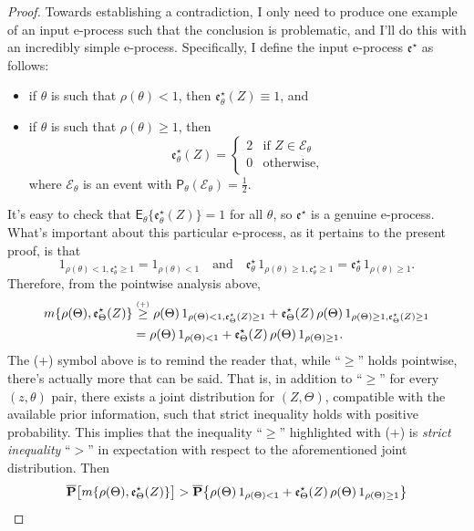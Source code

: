\documentclass[a4paper, 12pt]{article}
\theoremstyle{plain}
\theoremstyle{definition}
\theoremstyle{remark}
\newcommand{\prob}{\mathsf{P}}
\newcommand{\E}{\mathsf{E}}
\newcommand{\uuprob}{\mathbf{\overline{P}}}
\newcommand{\eval}{\mathfrak{e}}
\begin{document}
\begin{proof}
Towards establishing a contradiction, I only need to produce one example of an input e-process such that the conclusion is problematic, and I'll do this with an incredibly simple e-process.  Specifically, I define the input e-process $\eval^\star$ as follows:
\begin{itemize}
\item if $\theta$ is such that $\rho(\theta) < 1$, then $\eval_\theta^\star(Z) \equiv 1$, and 
\vspace{-2mm}
\item if $\theta$ is such that $\rho(\theta) \geq 1$, then  
\[ \eval_\theta^\star(Z) = \begin{cases} 2 & \text{if $Z \in \mathcal{E}_\theta$} \\ 0 & \text{otherwise}, \end{cases} \]
where $\mathcal{E}_\theta$ is an event with $\prob_\theta(\mathcal{E}_\theta) = \frac12$.
\end{itemize} 
It's easy to check that $\E_\theta\{ \eval_\theta^\star(Z) \} = 1$ for all $\theta$, so $\eval^\star$ is a genuine e-process.  What's important about this particular e-process, as it pertains to the present proof, is that 
\[ 1_{\rho(\theta) < 1, \eval_\theta^\star \geq 1} = 1_{\rho(\theta) < 1} \quad \text{and} \quad \eval_\theta^\star \, 1_{\rho(\theta) \geq 1, \eval_\theta^\star \geq 1} = \eval_\theta^\star \, 1_{\rho(\theta) \geq 1}. \]
Therefore, from the pointwise analysis above, 
\begin{align*}
m\{ \rho(\Theta), \eval_\Theta^\star(Z) \} & \overset{\text{\tiny (+)}}{\geq} \rho(\Theta) \, 1_{\rho(\Theta) < 1, \eval_\Theta^\star(Z) \geq 1} + \eval_\Theta^\star(Z) \, \rho(\Theta) \, 1_{\rho(\Theta) \geq 1, \eval_\Theta^\star(Z) \geq 1} \\
& = \rho(\Theta) \, 1_{\rho(\Theta) < 1} + \eval_\Theta^\star(Z) \, \rho(\Theta) \, 1_{\rho(\Theta) \geq 1}. 
\end{align*}
The (+) symbol above is to remind the reader that, while ``$\geq$'' holds pointwise, there's actually more that can be said.  That is, in addition to ``$\geq$'' for every $(z,\theta)$ pair, there exists a joint distribution for $(Z,\Theta)$, compatible with the available prior information, such that strict inequality holds with positive probability.  This implies that the inequality ``$\geq$'' highlighted with (+) is {\em strict inequality} ``$>$'' in expectation with respect to the aforementioned joint distribution.  Then 
\begin{align}
\uuprob\bigl[ m\{ \rho(\Theta), \eval_\Theta^\star(Z) \} \bigr] & > \uuprob\bigl\{ \rho(\Theta) \, 1_{\rho(\Theta) < 1} + \eval_\Theta^\star(Z) \, \rho(\Theta) \, 1_{\rho(\Theta) \geq 1} \bigr\} \notag \\

\end{align}
\end{proof}
\end{document}
